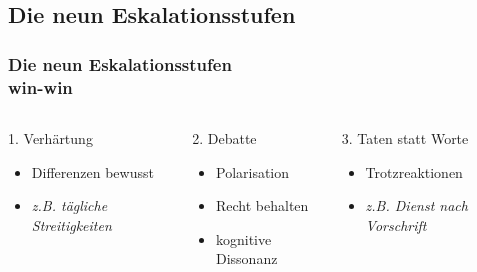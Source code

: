 \documentclass[
	ngerman,
	xcolor=dvipsnames,
	11pt
	]{beamer}
\begin{document}
\subsection{Die neun Eskalationsstufen}
\begin{frame}
	\frametitle{Die neun Eskalationsstufen\\win-win}
\begin{columns}[t]
	\begin{column}{0.33\textwidth}
		\begin{block}{1. Verhärtung}
			\begin{itemize}
				\item Differenzen bewusst
				\item \it z.B. tägliche Streitigkeiten
			\end{itemize}
		\end{block}
	\end{column}
	\pause
	\begin{column}{0.33\textwidth}
		\begin{block}{2. Debatte}
			\begin{itemize}
				\item Polarisation
				\item Recht behalten
				\item kognitive Dissonanz
			\end{itemize}
		\end{block}
	\end{column}
	\pause
	\begin{column}{0.33\textwidth}
		\begin{block}{3. Taten statt Worte}
			\begin{itemize}
				\item Trotzreaktionen
				\item \it z.B. Dienst nach Vorschrift
			\end{itemize}
		\end{block}
	\end{column}
\end{columns}
\end{frame}
\end{document}
